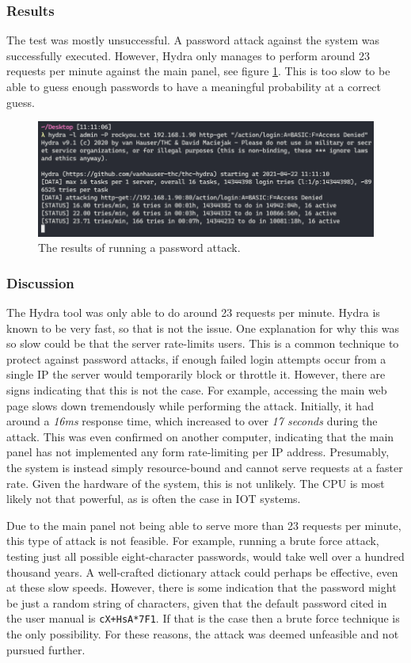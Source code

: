 \subsubsection{Results}
The test was mostly unsuccessful. A password attack against the system was successfully executed. However, Hydra only manages to perform around 23 requests per minute against the main panel, see figure \ref{fig:hydra-password-attack}. This is too slow to be able to guess enough passwords to have a meaningful probability at a correct guess.
\begin{figure}[!ht]
    \centering
    \includegraphics[width=\textwidth]{images/6-pentesting/hydra-results.png}
    \caption{The results of running a password attack.}
    \label{fig:hydra-password-attack}
\end{figure}

\subsubsection{Discussion}
The Hydra tool was only able to do around 23 requests per minute. Hydra is known to be very fast, so that is not the issue. One explanation for why this was so slow could be that the server rate-limits users. This is a common technique to protect against password attacks, if enough failed login attempts occur from a single IP the server would temporarily block or throttle it. However, there are signs indicating that this is not the case. For example, accessing the main web page slows down tremendously while performing the attack. Initially, it had around a \textit{16ms} response time, which increased to over \textit{17 seconds} during the attack. This was even confirmed on another computer, indicating that the main panel has not implemented any form rate-limiting per IP address. Presumably, the system is instead simply resource-bound and cannot serve requests at a faster rate. Given the hardware of the system, this is not unlikely. The CPU is most likely not that powerful, as is often the case in \gls{IOT} systems.

Due to the main panel not being able to serve more than 23 requests per minute, this type of attack is not feasible. For example, running a brute force attack, testing just all possible eight-character passwords, would take well over a hundred thousand years. A well-crafted dictionary attack could perhaps be effective, even at these slow speeds. However, there is some indication that the password might be just a random string of characters, given that the default password cited in the user manual is \texttt{cX+HsA*7F1}. If that is the case then a brute force technique is the only possibility. For these reasons, the attack was deemed unfeasible and not pursued further.
